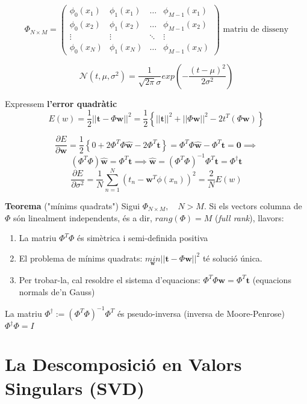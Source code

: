\documentclass[a4paper]{article}
\begin{document}
$$
\Phi_{N \times M} =
\begin{pmatrix}
\phi_0 (x_1) & \phi_1(x_1) & \ldots & \phi_{M-1} (x_1) \\
\phi_0 (x_2) & \phi_1(x_2) & \ldots & \phi_{M-1} (x_2) \\
\vdots & \vdots & \ddots & \vdots \\
\phi_0 (x_N) & \phi_1(x_N) & \ldots & \phi_{M-1} (x_N)
\end{pmatrix}
\text{ matriu de disseny}
$$

$$
\mathcal{N}(t, \mu, \sigma^2) = \frac{1}{\sqrt{2 \pi} \sigma} exp \left( - \frac{(t - \mu)^2}{2\sigma^2} \right)
$$

Expressem \textbf{l'error quadràtic}
$$
E(w) = \frac{1}{2} || \boldsymbol{t} - \Phi \boldsymbol{w} ||^2 = \frac{1}{2} \left\{ ||\boldsymbol{t}||^2 + ||\Phi \boldsymbol{w}||^2 - 2t^T(\Phi \boldsymbol{w}) \right\}
$$

$$
\frac{\partial E}{\partial \boldsymbol{w}} = \frac{1}{2} \left\{ 0 + 2 \Phi^T \Phi \hat{\boldsymbol{w}} - 2 \Phi^T \boldsymbol{t} \right\} = \Phi^T \Phi \hat{\boldsymbol{w}} - \Phi^T \boldsymbol{t} = \boldsymbol{0} \implies
$$
$$
\left( \Phi^T \Phi \right) \hat{\boldsymbol{w}} = \Phi^T \boldsymbol{t} \implies
\boxed{\hat{\boldsymbol{w}} = (\Phi^T \Phi)^{-1} \Phi^T \boldsymbol{t}} =
\Phi^{\dag} \boldsymbol{t}
$$
$$
\frac{\partial E}{\partial \sigma^2} = \frac{1}{N} \sum_{n=1}^N (t_n - \boldsymbol{w}^T \phi(x_n))^2 = \frac{2}{N} E(w)
$$

\textbf{Teorema} ("mínims quadrats")
Sigui $\Phi_{N\times M}, \quad N > M$. Si els vectors columna de $\Phi$ són linealment independents, és a dir, $rang(\Phi) = M$ (\emph{full rank}), llavors:

\begin{enumerate}
	\item La matriu $\Phi^T\Phi$ és simètrica i semi-definida positiva
	\item El problema de mínims quadrats: 
	$\underset{\boldsymbol{w}}{min} ||\boldsymbol{t} - \Phi \boldsymbol{w}||^2$ té solució única.
	\item Per trobar-la, cal resoldre el sistema d'equacions: $\Phi^T\Phi \boldsymbol{w} = \Phi^T \boldsymbol{t}$ (equacions normals de'n Gauss)
\end{enumerate}

La matriu $ \Phi^{\dag} := \left( \Phi^T \Phi \right)^{-1} \Phi^T $ és pseudo-inversa (inversa de Moore-Penrose) $ \Phi^{\dag} \Phi = I $

\section{La Descomposició en Valors Singulars (SVD)}
\end{document}
